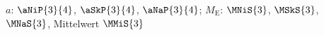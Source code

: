$a$: $\aNiP{3}{4}$, $\aSkP{3}{4}$, $\aNaP{3}{4}$; $M_\mathrm{E}$: $\MNiS{3}$, $\MSkS{3}$, $\MNaS{3}$, Mittelwert $\MMiS{3}$
